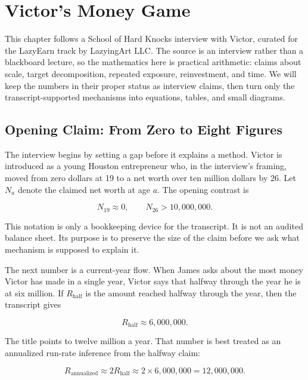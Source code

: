 \chapter{Victor's Money Game}

This chapter follows a School of Hard Knocks interview with Victor, curated for the LazyEarn track by LazyingArt LLC. The source is an interview rather than a blackboard lecture, so the mathematics here is practical arithmetic: claims about scale, target decomposition, repeated exposure, reinvestment, and time. We will keep the numbers in their proper status as interview claims, then turn only the transcript-supported mechanisms into equations, tables, and small diagrams.

\section{Opening Claim: From Zero to Eight Figures}

The interview begins by setting a gap before it explains a method. Victor is introduced as a young Houston entrepreneur who, in the interview's framing, moved from zero dollars at 19 to a net worth over ten million dollars by 26. Let \(N_a\) denote the claimed net worth at age \(a\). The opening contrast is

\begin{equation}
N_{19} \approx 0,
\qquad
N_{26} > 10{,}000{,}000.
\end{equation}

This notation is only a bookkeeping device for the transcript. It is not an audited balance sheet. Its purpose is to preserve the size of the claim before we ask what mechanism is supposed to explain it.

The next number is a current-year flow. When James asks about the most money Victor has made in a single year, Victor says that halfway through the year he is at six million. If \(R_{\text{half}}\) is the amount reached halfway through the year, then the transcript gives

\begin{equation}
R_{\text{half}} \approx 6{,}000{,}000.
\end{equation}

The title points to twelve million a year. That number is best treated as an annualized run-rate inference from the halfway claim:

\begin{equation}
R_{\text{annualized}}
\approx 2R_{\text{half}}
\approx 2 \times 6{,}000{,}000
= 12{,}000{,}000.
\end{equation}

